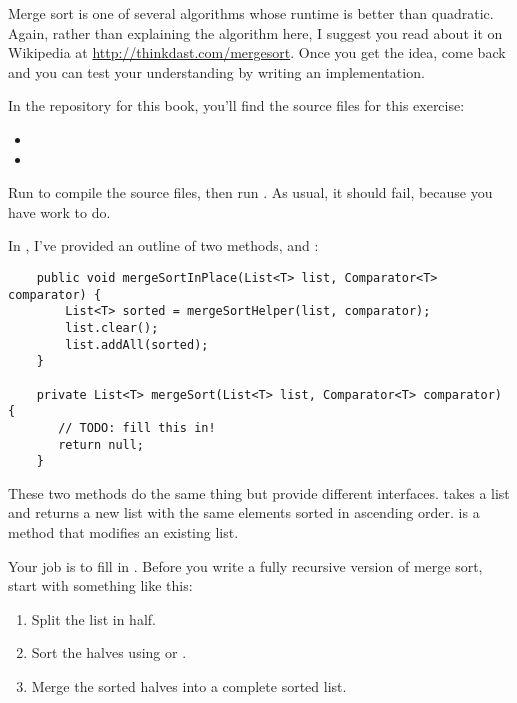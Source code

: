 \documentclass[12pt]{book}
\theoremstyle{exercise}
\begin{document}
Merge sort is one of several algorithms whose runtime is better than
quadratic. Again, rather than explaining the algorithm here, I suggest
you read about it on Wikipedia at
\url{http://thinkdast.com/mergesort}.  Once you get the idea, come
back and you can test your understanding by writing an implementation.


In the repository for this book, you'll find the source files for this
exercise:

\begin{itemize}

\item

\item

\end{itemize}

Run  to compile the source files, then run
. As usual, it should
fail, because you have work to do.


In , I've provided an outline of two methods,
 and :

\begin{verbatim}
    public void mergeSortInPlace(List<T> list, Comparator<T> comparator) {
        List<T> sorted = mergeSortHelper(list, comparator);
        list.clear();
        list.addAll(sorted);
    }

    private List<T> mergeSort(List<T> list, Comparator<T> comparator) {
       // TODO: fill this in!
       return null;
    }
\end{verbatim}

These two methods do the same thing but provide different interfaces.
 takes a list and returns a new list with the same
elements sorted in ascending order.  is a
 method that modifies an existing list.


Your job is to fill in . Before you write a fully
recursive version of merge sort, start with something like this:

\begin{enumerate}

\item
  Split the list in half.

\item
  Sort the halves using  or
  .

\item
  Merge the sorted halves into a complete sorted list.

\end{enumerate}
\end{document}

